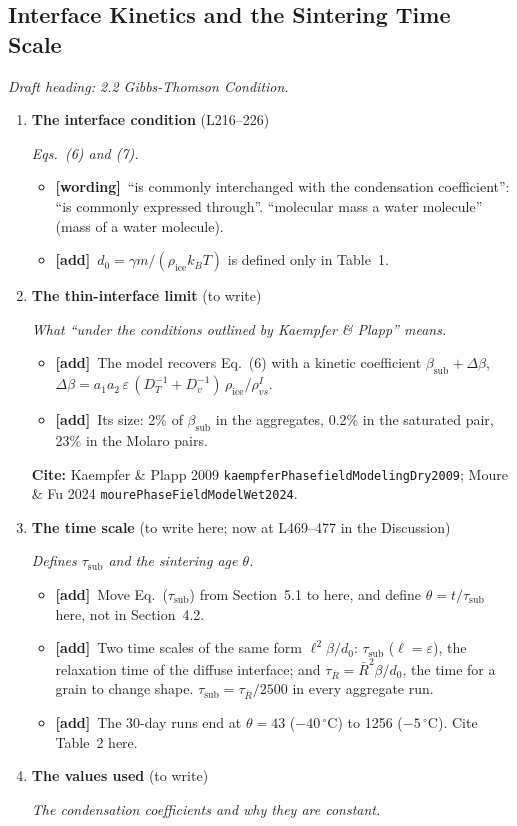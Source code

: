 \documentclass[11pt]{article}
\newcommand{\Cite}[1]{\par{\footnotesize\raggedright\textcolor{have}{\textbf{Cite:}} #1\par}}
\newcommand{\Pg}[3]{\item \textbf{#1} {\small(#2)}\par\textit{#3}}
\newcommand{\tG}{\textcolor{stale}{\textbf{[wording]}}\ }
\newcommand{\tA}{\textcolor{have}{\textbf{[add]}}\ }
\begin{document}
\subsection{Interface Kinetics and the Sintering Time Scale}
\textit{Draft heading: 2.2 Gibbs-Thomson Condition.}
\begin{enumerate}
\Pg{The interface condition}{L216--226}{Eqs.~(6) and (7).}
  \begin{itemize}
  \item \tG ``is commonly interchanged with the condensation coefficient'':
    ``is commonly expressed through''. ``molecular mass a water molecule''
    (mass of a water molecule).
  \item \tA $d_0 = \gamma m/(\rho_{\mathrm{ice}} k_B T)$ is defined only in
    Table~1.
  \end{itemize}
\Pg{The thin-interface limit}{to write}{What ``under the conditions outlined by Kaempfer \& Plapp'' means.}
  \begin{itemize}
  \item \tA The model recovers Eq.~(6) with a kinetic coefficient
    $\beta_{\mathrm{sub}} + \Delta\beta$, $\Delta\beta = a_1 a_2\,
    \varepsilon\,(D_T^{-1} + D_v^{-1})\,\rho_{\mathrm{ice}}/\rho_{vs}^{I}$.
  \item \tA Its size: 2\% of $\beta_{\mathrm{sub}}$ in the aggregates, 0.2\%
    in the saturated pair, 23\% in the Molaro pairs.
  \end{itemize}
  \Cite{Kaempfer \& Plapp 2009 \texttt{kaempferPhasefieldModelingDry2009}; Moure \& Fu 2024 \texttt{mourePhaseFieldModelWet2024}.}
\Pg{The time scale}{to write here; now at L469--477 in the Discussion}{Defines $\tau_{\mathrm{sub}}$ and the sintering age $\theta$.}
  \begin{itemize}
  \item \tA Move Eq.~($\tau_{\mathrm{sub}}$) from Section~5.1 to here, and
    define $\theta = t/\tau_{\mathrm{sub}}$ here, not in Section~4.2.
  \item \tA Two time scales of the same form $\ell^{2}\beta/d_0$:
    $\tau_{\mathrm{sub}}$ ($\ell = \varepsilon$), the relaxation time of
    the diffuse interface; and $\tau_{\bar R} = \bar R^{2}\beta/d_0$, the
    time for a grain to change shape. $\tau_{\mathrm{sub}} =
    \tau_{\bar R}/2500$ in every aggregate run.
  \item \tA The 30-day runs end at $\theta = 43$ ($-40\,^{\circ}$C) to 1256
    ($-5\,^{\circ}$C). Cite Table~2 here.
  \end{itemize}
\Pg{The values used}{to write}{The condensation coefficients and why they are constant.}

\end{enumerate}
\end{document}
